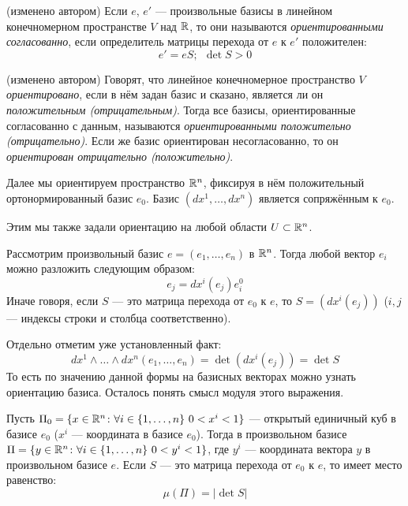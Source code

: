 \begin{definition} (изменено автором)
	Если $e$, $e'$ --- произвольные базисы в линейном конечномерном пространстве $V$ над $\mathbb{R}$, то они называются \textit{ориентированными согласованно}, если определитель матрицы перехода от $e$ к $e'$ положителен:
	\[
		e' = eS;\ \ \det S > 0
	\]
\end{definition}

\begin{definition} (изменено автором)
	Говорят, что линейное конечномерное пространство $V$ \textit{ориентировано}, если в нём задан базис и сказано, является ли он \textit{положительным (отрицательным)}. Тогда все базисы, ориентированные согласованно с данным, называются \textit{ориентированными положительно (отрицательно)}. Если же базис ориентирован несогласованно, то он \textit{ориентирован отрицательно (положительно)}.
\end{definition}

\begin{note}
	Далее мы ориентируем пространство $\mathbb{R}^n$, фиксируя в нём положительный ортонормированный базис $e_0$. Базис $(dx^1, \ldots, dx^n)$ является сопряжённым к $e_0$.
\end{note}

\begin{anote}
	Этим мы также задали ориентацию на любой области $U \subset \mathbb{R}^n$.
\end{anote}

\begin{note}
	Рассмотрим произвольный базис $e = (e_1, \ldots, e_n)$ в $\mathbb{R}^n$. Тогда любой вектор $e_i$ можно разложить следующим образом:
	\[
		e_j = dx^i(e_j)e_i^0
	\]
	Иначе говоря, если $S$ --- это матрица перехода от $e_0$ к $e$, то $S = (dx^i(e_j))$ ($i, j$ --- индексы строки и столбца соответственно).
	
	Отдельно отметим уже установленный факт:
	\[
		dx^1 \wedge \ldots \wedge dx^n (e_1, \ldots, e_n) = \det(dx^i(e_j)) = \det S
	\]
	То есть по значению данной формы на базисных векторах можно узнать ориентацию базиса. Осталось понять смысл модуля этого выражения.
\end{note}

\begin{proposition}
	Пусть $\Pi_0 = \{x \in \mathbb{R}^n \colon \forall i \in \{1, \ldots, n\} \ 0 < x^i < 1\}$ --- открытый единичный куб в базисе $e_0$ ($x^i$ --- координата в базисе $e_0$). Тогда в произвольном базисе $\Pi = \{y \in \mathbb{R}^n \colon \forall i \in \{1, \ldots, n\}\ 0 < y^i < 1\}$, где $y^i$ --- координата вектора $y$ в произвольном базисе $e$. Если $S$ --- это матрица перехода от $e_0$ к $e$, то имеет место равенство:
	\[
		\mu(\Pi) = |\det S|
	\]
\end{proposition}

